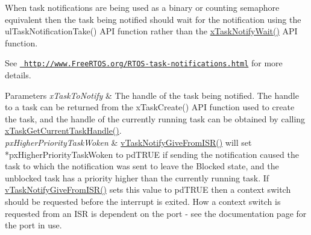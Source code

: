 \begin{DoxyPre}When task notifications are being used as a binary or counting semaphore
equivalent then the task being notified should wait for the notification
using the ulTaskNotificationTake() API function rather than the
\mbox{\hyperlink{task_8h_a0475fcda9718f403521c270a7270ff93}{xTaskNotifyWait()}} API function.\end{DoxyPre}



\begin{DoxyPre}See \href{http://www.FreeRTOS.org/RTOS-task-notifications.html}{\texttt{ http://www.FreeRTOS.org/RTOS-task-notifications.html}} for more details.\end{DoxyPre}



\begin{DoxyPre}
\begin{DoxyParams}{Parameters}
{\em xTaskToNotify} & The handle of the task being notified.  The handle to a
task can be returned from the xTaskCreate() API function used to create the
task, and the handle of the currently running task can be obtained by calling
\mbox{\hyperlink{task_8h_a85a0f9c9f817b18686efbf8f37c72dfc}{xTaskGetCurrentTaskHandle()}}.\\
\hline
{\em pxHigherPriorityTaskWoken} & \mbox{\hyperlink{task_8h_a4a4bcf98ad282a596e13f3f30582a11b}{vTaskNotifyGiveFromISR()}} will set
*pxHigherPriorityTaskWoken to pdTRUE if sending the notification caused the
task to which the notification was sent to leave the Blocked state, and the
unblocked task has a priority higher than the currently running task.  If
\mbox{\hyperlink{task_8h_a4a4bcf98ad282a596e13f3f30582a11b}{vTaskNotifyGiveFromISR()}} sets this value to pdTRUE then a context switch
should be requested before the interrupt is exited.  How a context switch is
requested from an ISR is dependent on the port - see the documentation page
for the port in use.
\\
\hline
\end{DoxyParams}
\end{DoxyPre}
